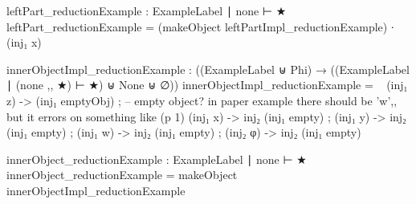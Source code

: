 \newcommand{\reductionSequence}{%
\begin{code}
  

infix  2 _⟿*_
infix  1 begin_
infixr 2 _⟿→⟨_⟩_
infix  3 _∎

data _⟿*_ : ∀ {L Γ A} → (L ∣ Γ ⊢ A) → (L ∣ Γ ⊢ A) → Set where

  _∎ : ∀ {L Γ A} (M : L ∣ Γ ⊢ A)
      --------
    → M ⟿* M

  _⟿→⟨_⟩_ : ∀ {L Γ A} (K : L ∣ Γ ⊢ A) {M N : L ∣ Γ ⊢ A}
    → K ⟿ M
    → M ⟿* N
      ---------
    → K ⟿* N

begin_ : ∀ {L} {Γ} {A} {M N : L ∣ Γ ⊢ A}
  → M ⟿* N
    ------
  → M ⟿* N
begin M⟿→N = M⟿→N

\end{code}}

\newcommand{\reductionExample}{%
\begin{code}

innerObjectLeftPartImpl_reductionExample : ((ExampleLabel ⊎ Phi) → ((ExampleLabel ∣ (none ,, ★ ,, ★) ⊢ ★) ⊎ None ⊎ ∅))
innerObjectLeftPartImpl_reductionExample = \ {
      (inj₁ y) -> inj₂ (inj₂ void) ; 
      (inj₁ x) -> inj₂ (inj₁ empty) ;
      (inj₁ z) -> inj₂ (inj₁ empty) ;
      (inj₁ w) -> inj₂ (inj₁ empty) ;
      (inj₂ φ) -> inj₂ (inj₁ empty) }

innerObjectLeftPart_reductionExample : ExampleLabel ∣ (none ,, ★) ⊢ ★
innerObjectLeftPart_reductionExample = makeObject innerObjectLeftPartImpl_reductionExample

leftPartImpl_reductionExample : ((ExampleLabel ⊎ Phi) → ((ExampleLabel ∣ (none ,, ★) ⊢ ★) ⊎ None ⊎ ∅))
leftPartImpl_reductionExample = \{
  (inj₁ x) -> inj₁ (innerObjectLeftPart_reductionExample) ; 
  (inj₁ y) -> inj₂ (inj₁ empty) ;
  (inj₁ z) -> inj₂ (inj₁ empty) ;
  (inj₁ w) -> inj₂ (inj₁ empty) ;
  (inj₂ φ) -> inj₂ (inj₁ empty)}

leftPart_reductionExample : ExampleLabel ∣ none ⊢ ★
leftPart_reductionExample = (makeObject leftPartImpl_reductionExample) ∙ (inj₁ x)

innerObjectImpl_reductionExample : ((ExampleLabel ⊎ Phi) → ((ExampleLabel ∣ (none ,, ★) ⊢ ★) ⊎ None ⊎ ∅))
innerObjectImpl_reductionExample = \ {  
  (inj₁ z) -> (inj₁ emptyObj) ; -- empty object? in paper example there should be 'w',, but it errors on something like (p 1)
  (inj₁ x) -> inj₂ (inj₁ empty) ;
  (inj₁ y) -> inj₂ (inj₁ empty) ;
  (inj₁ w) -> inj₂ (inj₁ empty) ;
  (inj₂ φ) -> inj₂ (inj₁ empty) }

innerObject_reductionExample : ExampleLabel ∣ none ⊢ ★
innerObject_reductionExample = makeObject innerObjectImpl_reductionExample

